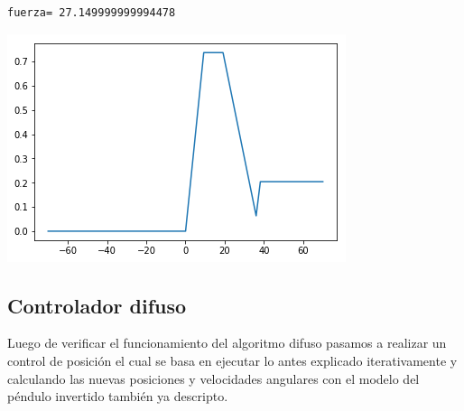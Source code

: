 \documentclass[onecolumn]{article}
\begin{document}
\begin{verbatim}
fuerza= 27.149999999994478
\end{verbatim}

\includegraphics{output_29_1.png}

\hypertarget{controlador-difuso}{%
\subsection{Controlador difuso}\label{controlador-difuso}}

Luego de verificar el funcionamiento del algoritmo difuso pasamos a
realizar un control de posición el cual se basa en ejecutar lo antes
explicado iterativamente y calculando las nuevas posiciones y
velocidades angulares con el modelo del péndulo invertido también ya
descripto.
\end{document}
